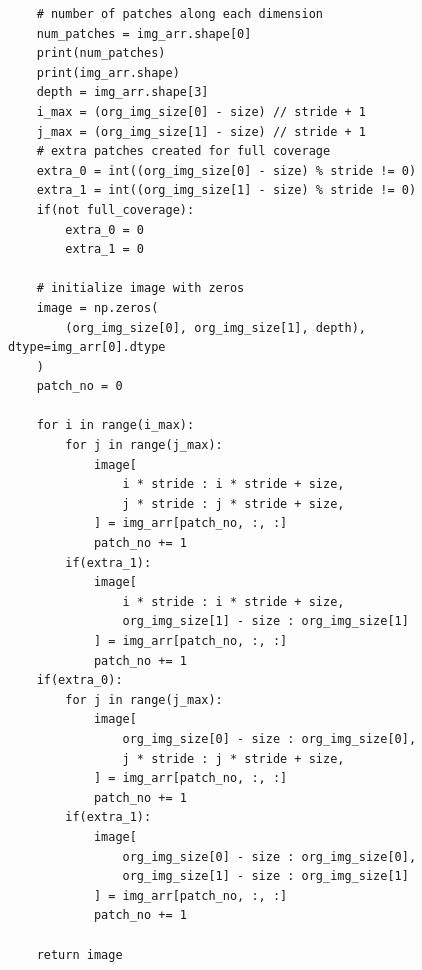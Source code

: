 \documentclass[12pt, a4paper]{report}
\begin{document}
\begin{verbatim}
    # number of patches along each dimension
    num_patches = img_arr.shape[0]
    print(num_patches)
    print(img_arr.shape)
    depth = img_arr.shape[3]
    i_max = (org_img_size[0] - size) // stride + 1
    j_max = (org_img_size[1] - size) // stride + 1
    # extra patches created for full coverage
    extra_0 = int((org_img_size[0] - size) % stride != 0)
    extra_1 = int((org_img_size[1] - size) % stride != 0)
    if(not full_coverage):
        extra_0 = 0
        extra_1 = 0

    # initialize image with zeros
    image = np.zeros(
        (org_img_size[0], org_img_size[1], depth), dtype=img_arr[0].dtype
    )
    patch_no = 0

    for i in range(i_max):
        for j in range(j_max):
            image[
                i * stride : i * stride + size,
                j * stride : j * stride + size,
            ] = img_arr[patch_no, :, :]
            patch_no += 1
        if(extra_1):
            image[
                i * stride : i * stride + size,
                org_img_size[1] - size : org_img_size[1]
            ] = img_arr[patch_no, :, :]
            patch_no += 1
    if(extra_0):
        for j in range(j_max):
            image[
                org_img_size[0] - size : org_img_size[0],
                j * stride : j * stride + size,
            ] = img_arr[patch_no, :, :]
            patch_no += 1
        if(extra_1):
            image[
                org_img_size[0] - size : org_img_size[0],
                org_img_size[1] - size : org_img_size[1]
            ] = img_arr[patch_no, :, :]
            patch_no += 1

    return image
\end{verbatim}
\end{document}
